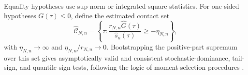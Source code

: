 Equality hypotheses use sup-norm or integrated-square statistics. For one-sided hypotheses $G(\tau)\le0$, define the estimated contact set
\[
 \widehat{\mathcal C}_{N,n}
 =\left\{\tau:
 \frac{r_{N,n}\widehat G(\tau)}{\widehat s_\kappa(\tau)}
 \ge-\eta_{N,n}
 \right\},
\]
with $\eta_{N,n}\to\infty$ and $\eta_{N,n}/r_{N,n}\to0$. Bootstrapping the positive-part supremum over this set gives asymptotically valid and consistent stochastic-dominance, tail-sign, and quantile-sign tests, following the logic of moment-selection procedures \citep{AndrewsSoares2010,LintonSongWhang2010,FangSantos2019}.
